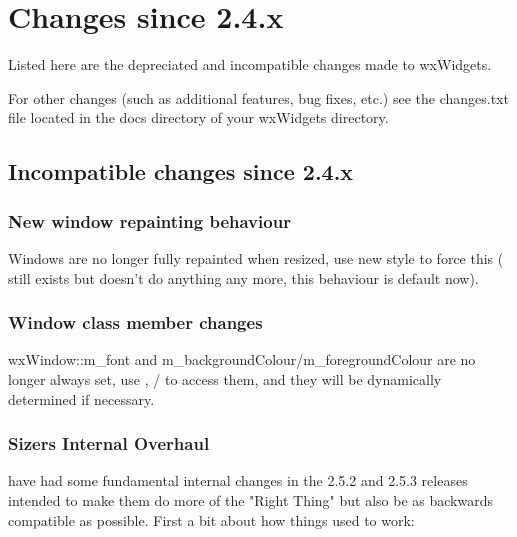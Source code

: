 \section{Changes since 2.4.x}\label{changes}

Listed here are the depreciated and incompatible changes made to wxWidgets.

For other changes (such as additional features, bug fixes, etc.) see the changes.txt file located in the docs directory of your wxWidgets directory.



\subsection{Incompatible changes since 2.4.x}\label{incompatiblesince24}

\subsubsection{New window repainting behaviour}\label{newwindowrepainting}

Windows are no longer fully repainted when resized, use new style  to force this ( still exists but doesn't do anything any more, this behaviour is default now).



\subsubsection{Window class member changes}\label{windowclassmemberchanges}

wxWindow::m\_font and m\_backgroundColour/m\_foregroundColour are no longer always set, use , / to access them, and they will be dynamically determined if necessary.



\subsubsection{Sizers Internal Overhaul}\label{sizersinternaloverhaul}

 have had some fundamental internal changes in the 2.5.2 and 2.5.3 releases intended to make them do more of the "Right Thing" but also be as backwards compatible as possible.  First a bit about how things used to work:


